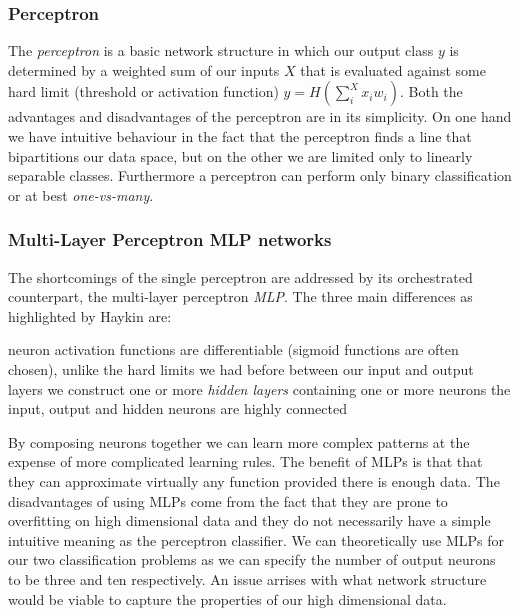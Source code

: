 \documentclass[11pt,a4paper]{article}
\begin{document}
\subsubsection{Perceptron}
The \textit{perceptron} is a basic network structure in which our output class \(y\) is determined by a weighted sum of our inputs \(X\) that is evaluated against some hard limit (threshold or activation function) \(y = H(\sum_{i}^{X} x_i w_i)\). Both the advantages and disadvantages of the perceptron are in its simplicity. On one hand we have intuitive behaviour in the fact that the perceptron finds a line that bipartitions our data space, but on the other we are limited only to linearly separable classes. Furthermore a perceptron can perform only binary classification or at best \textit{one-vs-many}.

\subsubsection{Multi-Layer Perceptron MLP networks}
The shortcomings of the single perceptron are addressed by its orchestrated counterpart, the multi-layer perceptron \textit{MLP}. The three main differences as highlighted by Haykin \autocite{Haykin1998} are:

\begin{outline}
  \1 neuron activation functions are differentiable (sigmoid functions are often chosen), unlike the hard limits we had before
  \1 between our input and output layers we construct one or more \textit{hidden layers} containing one or more neurons
  \1 the input, output and hidden neurons are highly connected
\end{outline}

By composing neurons together we can learn more complex patterns at the expense of more complicated learning rules. The benefit of MLPs is that that they can approximate virtually any function provided there is enough data. The disadvantages of using MLPs come from the fact that they are prone to overfitting on high dimensional data and they do not necessarily have a simple intuitive meaning as the perceptron classifier. We can theoretically use MLPs for our two classification problems as we can specify the number of output neurons to be three and ten respectively. An issue arrises with what network structure would be viable to capture the properties of our high dimensional data. 
\end{document}
